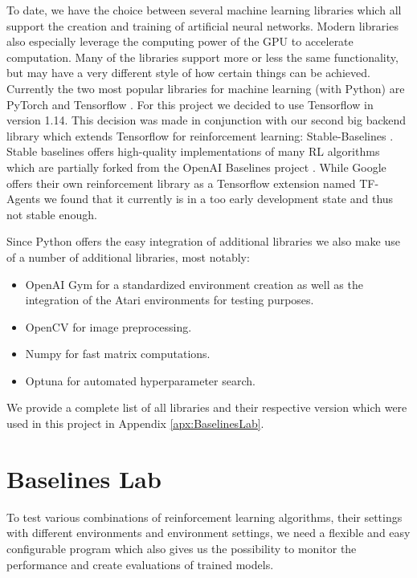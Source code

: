 To date, we have the choice between several machine learning libraries which all support the creation and training of artificial neural networks. Modern libraries also especially leverage the computing power of the GPU to accelerate computation. Many of the libraries support more or less the same functionality, but may have a very different style of how certain things can be achieved. Currently the two most popular libraries for machine learning (with Python) are PyTorch \cite{paszke2019pytorch} and Tensorflow \cite{abadi2016tensorflow}. For this project we decided to use Tensorflow in version 1.14. This decision was made in conjunction with our second big backend library which extends Tensorflow for reinforcement learning: Stable-Baselines \cite{stable-baselines}. Stable baselines offers high-quality implementations of many RL algorithms which are partially forked from the OpenAI Baselines project \cite{baselines}. While Google offers their own reinforcement library as a Tensorflow extension named TF-Agents \cite{TFAgents} we found that it currently is in a too early development state and thus not stable enough.

Since Python offers the easy integration of additional libraries we also make use of a number of additional libraries, most notably:
\begin{itemize}
    \item OpenAI Gym \cite{openAIgym} for a standardized environment creation as well as the integration of the Atari environments for testing purposes.
    \item OpenCV \cite{opencv_library} for image preprocessing.
    \item Numpy \cite{oliphant2006guide} for fast matrix computations.
    \item Optuna \cite{akiba2019optuna} for automated hyperparameter search.
\end{itemize}

We provide a complete list of all libraries and their respective version which were used in this project in Appendix \ref{apx:BaselinesLab}.  

\section{Baselines Lab} \label{sec:BaselinesLab}
To test various combinations of reinforcement learning algorithms, their settings with different environments and environment settings, we need a flexible and easy configurable program which also gives us the possibility to monitor the performance and create evaluations of trained models. 

